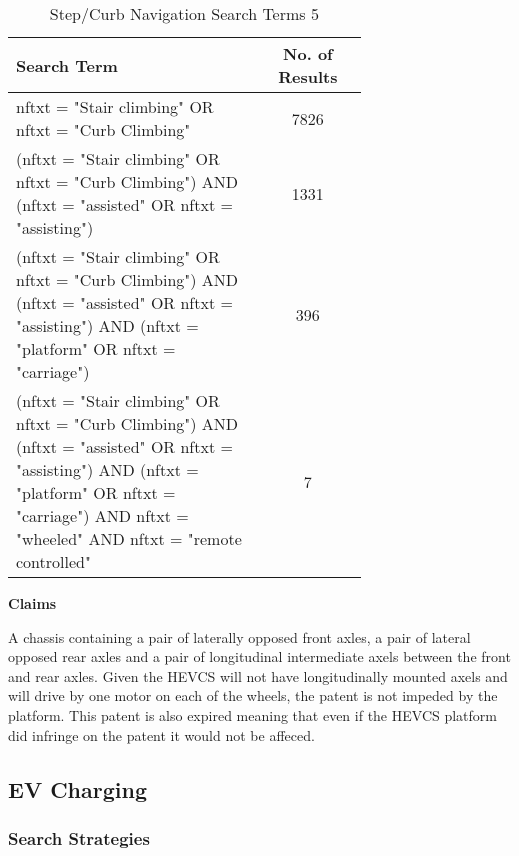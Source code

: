 \documentclass [12pt]{article}
\begin{document}
\begin{table}[H]
    \centering
    \setlength{\arrayrulewidth}{1.5pt}
    \begin{tabular}{|p{0.7\linewidth}|c|}
    \hline
    \cellcolor{gray!40}Search Term & \cellcolor{gray!40}No. of Results \\
    \hline
    nftxt = "Stair climbing" OR nftxt = "Curb Climbing" & 7826 \\
    \hline
    (nftxt = "Stair climbing" OR nftxt = "Curb Climbing") AND (nftxt = "assisted" OR nftxt = "assisting") & 1331 \\
    \hline
    (nftxt = "Stair climbing" OR nftxt = "Curb Climbing") AND (nftxt = "assisted" OR nftxt = "assisting") AND (nftxt = "platform" OR nftxt = "carriage") & 396 \\
    \hline
    (nftxt = "Stair climbing" OR nftxt = "Curb Climbing") AND (nftxt = "assisted" OR nftxt = "assisting") AND (nftxt = "platform" OR nftxt = "carriage") AND nftxt = "wheeled" AND nftxt = "remote controlled"& 7 \\
    \hline
    \end{tabular}
    \caption{Step/Curb Navigation Search Terms 5}
    \label{table:step_curb_nav_st_5}
\end{table}

\textbf{Claims}

A chassis containing a pair of laterally opposed front axles, a pair of lateral opposed rear axles and a pair of longitudinal intermediate axels between the front and rear axles.
Given the HEVCS will not have longitudinally mounted axels and will drive by one motor on each of the wheels, the patent is not impeded by the platform.
This patent is also expired meaning that even if the HEVCS platform did infringe on the patent it would not be affeced.



\subsection{EV Charging}\label{sec:ev_charging}

\cite{Home_Chargepoints}

\subsubsection{Search Strategies}\label{sec:EV_Charging_Search_Term}
\end{document}
